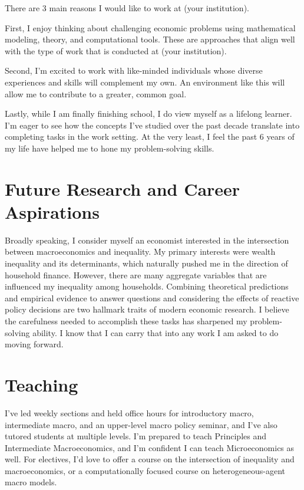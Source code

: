 \documentclass[11pt]{article}
\begin{document}
There are 3 main reasons I would like to work at (your institution).

First, I enjoy thinking about challenging economic problems using mathematical modeling, theory, and computational tools. These are approaches that align well with the type of work that is conducted at (your institution).

Second, I'm excited to work with like-minded individuals whose diverse experiences and skills will complement my own. An environment like this will allow me to contribute to a greater, common goal.

Lastly, while I am finally finishing school, I do view myself as a lifelong learner. I'm eager to see how the concepts I've studied over the past decade translate into completing tasks in the work setting. At the very least, I feel the past 6 years of my life have helped me to hone my problem-solving skills.



\section{\large Future Research and Career Aspirations} %

Broadly speaking, I consider myself an economist interested in the intersection between macroeconomics and inequality. My primary interests were wealth inequality and its determinants, which naturally pushed me in the direction of household finance. However, there are many aggregate variables that are influenced my inequality among households. Combining theoretical predictions and empirical evidence to answer questions and considering the effects of reactive policy decisions are two hallmark traits of modern economic research. I believe the carefulness needed to accomplish these tasks has sharpened my problem-solving ability. I know that I can carry that into any work I am asked to do moving forward. 

\section{\large Teaching}

I’ve led weekly sections and held office hours for introductory macro, intermediate macro, 
and an upper-level macro policy seminar, and I’ve also tutored students at multiple levels. 
I’m prepared to teach Principles and Intermediate Macroeconomics, and I’m confident I can 
teach Microeconomics as well. For electives, I’d love to offer a course on the intersection 
of inequality and macroeconomics, or a computationally focused course on heterogeneous-agent 
macro models.
\end{document}
